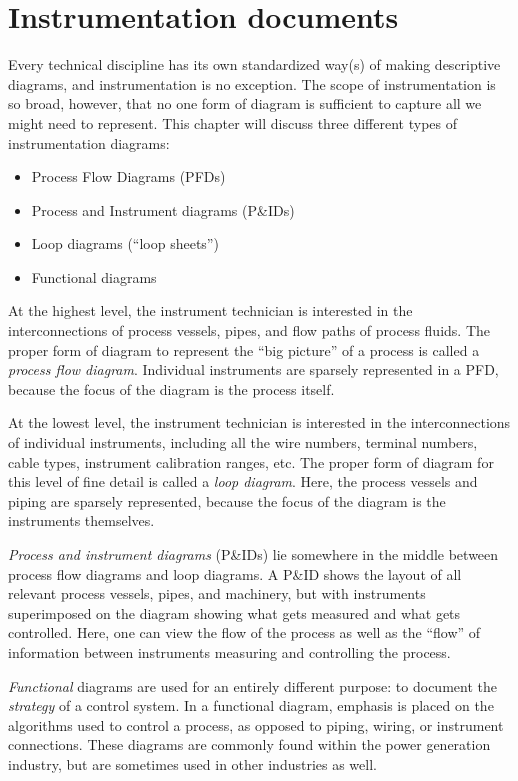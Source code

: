 
\chapter{Instrumentation documents}

Every technical discipline has its own standardized way(s) of making descriptive diagrams, and instrumentation is no exception.  The scope of instrumentation is so broad, however, that no one form of diagram is sufficient to capture all we might need to represent.  This chapter will discuss three different types of instrumentation diagrams:

\begin{itemize}
\item Process Flow Diagrams (PFDs)
\item Process and Instrument diagrams (P\&IDs)
\item Loop diagrams (``loop sheets'')
\item Functional diagrams
\end{itemize}

At the highest level, the instrument technician is interested in the interconnections of process vessels, pipes, and flow paths of process fluids.  The proper form of diagram to represent the ``big picture'' of a process is called a \textit{process flow diagram}.  Individual instruments are sparsely represented in a PFD, because the focus of the diagram is the process itself.

At the lowest level, the instrument technician is interested in the interconnections of individual instruments, including all the wire numbers, terminal numbers, cable types, instrument calibration ranges, etc.  The proper form of diagram for this level of fine detail is called a \textit{loop diagram}.  Here, the process vessels and piping are sparsely represented, because the focus of the diagram is the instruments themselves.

\textit{Process and instrument diagrams} (P\&IDs) lie somewhere in the middle between process flow diagrams and loop diagrams.  A P\&ID shows the layout of all relevant process vessels, pipes, and machinery, but with instruments superimposed on the diagram showing what gets measured and what gets controlled.  Here, one can view the flow of the process as well as the ``flow'' of information between instruments measuring and controlling the process.

\textit{Functional} diagrams are used for an entirely different purpose: to document the \textit{strategy} of a control system.  In a functional diagram, emphasis is placed on the algorithms used to control a process, as opposed to piping, wiring, or instrument connections.  These diagrams are commonly found within the power generation industry, but are sometimes used in other industries as well.

